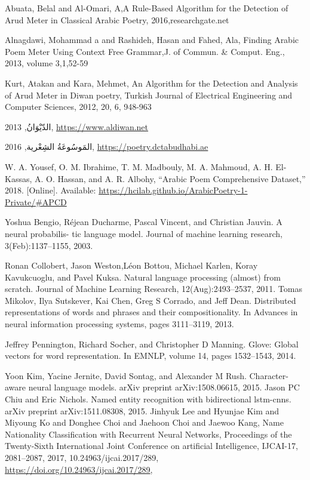 \begin{thebibliography}{999}
Abuata, Belal and Al-Omari‏, A,A Rule-Based Algorithm for the Detection of Arud Meter in Classical Arabic Poetry, 2016‏,researchgate.net‏

 Alnagdawi, Mohammad a and Rashideh, Hasan and Fahed, Ala, Finding Arabic Poem Meter Using Context Free Grammar,J. of Commun. {\&} Comput. Eng., 2013, volume  3,1,52-59

 Kurt, Atakan and Kara, Mehmet, An Algorithm for the Detection and Analysis of Arud Meter in Diwan poetry, Turkish Journal of Electrical Engineering and Computer Sciences, 2012, 20, 6, 948-963
  
 \textarabic{الدّيْوَانُ}, 2013, \url{https://www.aldiwan.net}

\textarabic{المَوسُوعَةُ الشِعْرية}, 2016, \url{https://poetry.dctabudhabi.ae}

 W. A. Yousef, O. M. Ibrahime, T. M. Madbouly, M. A. Mahmoud, A. H. El-Kassas, A. O. Hassan, and A. R. Albohy, “Arabic Poem Comprehensive Dataset,” 2018. [Online]. Available: \url{https://hcilab.github.io/ArabicPoetry-1-Private/\#APCD}

    Yoshua Bengio, Réjean Ducharme,
Pascal Vincent, and Christian Jauvin. A neural probabilis-
tic language model. Journal of machine learning research,
3(Feb):1137–1155, 2003.

 Ronan Collobert, Jason Weston,Léon Bottou, Michael Karlen, Koray Kavukcuoglu, and Pavel Kuksa. Natural language processing (almost) from scratch. Journal of Machine Learning Research, 12(Aug):2493–2537, 2011.
 Tomas Mikolov, Ilya Sutskever, Kai Chen, Greg S Corrado, and Jeff Dean. Distributed representations of words and phrases and their compositionality. In Advances in neural information processing systems, pages 3111–3119, 2013.

 Jeffrey Pennington, Richard Socher, and Christopher D Manning. Glove: Global vectors for word representation. In EMNLP, volume 14, pages 1532–1543, 2014.

 Yoon Kim, Yacine Jernite, David Sontag, and Alexander M Rush. Character-aware neural language models. arXiv preprint arXiv:1508.06615, 2015.
 Jason PC Chiu and Eric Nichols. Named entity recognition with bidirectional lstm-cnns. arXiv preprint arXiv:1511.08308, 2015.
 Jinhyuk Lee and Hyunjae Kim and Miyoung Ko and Donghee Choi and Jaehoon Choi and Jaewoo Kang, Name Nationality Classification with Recurrent Neural Networks, Proceedings of the Twenty-Sixth International Joint Conference on artificial Intelligence, {IJCAI-17}, 2081--2087, 2017, 10.24963/ijcai.2017/289, \url{https://doi.org/10.24963/ijcai.2017/289},


\end{thebibliography}
